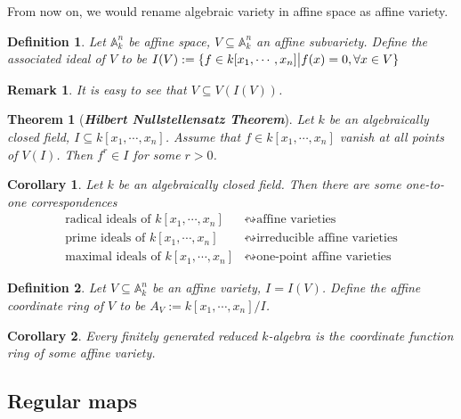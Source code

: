\documentclass{ctexart}
\newtheorem{definition}{Definition}[section]
\newtheorem{remark}{Remark}[section]
\newtheorem{theorem}{Theorem}[section]
\newtheorem{corollary}{Corollary}[section]
\begin{document}
From now on, we would rename algebraic variety in affine space as affine variety.
\begin{definition}
    Let $\mathbb{A}_{k}^{n}$ be affine space, $V \subseteq \mathbb{A}_{k}^{n}$ an affine subvariety.
    Define the associated ideal of $V$ to be $I(V) := \{f\in k[x_{1}, \cdots, x_{n}] \big{|} f(x) = 0, \forall x\in V\}$
\end{definition}
\begin{remark}
    It is easy to see that $V \subseteq V(I(V))$.
\end{remark}
\begin{theorem}[\textbf{\emph{Hilbert Nullstellensatz Theorem}}]
    Let $k$ be an algebraically closed field, $I \subseteq k[x_{1}, \cdots, x_{n}]$.
    Assume that $f\in k[x_{1}, \cdots, x_{n}]$ vanish at all points of $V(I)$.
    Then $f^{r}\in I$ for some $r > 0$.
    \label{Theorem 1.1}
\end{theorem}
\begin{corollary}
    Let $k$ be an algebraically closed field.
    Then there are some one-to-one correspondences
    \begin{equation*}
        \begin{split}
            \text{radical ideals of $k[x_{1}, \cdots, x_{n}]$} & \leftrightsquigarrow \text{affine varieties} \\ 
            \text{prime ideals of $k[x_{1}, \cdots, x_{n}]$} & \leftrightsquigarrow \text{irreducible affine varieties} \\ 
            \text{maximal ideals of $k[x_{1}, \cdots, x_{n}]$} & \leftrightsquigarrow \text{one-point affine varieties} 
        \end{split}
    \end{equation*}
    \label{Corollary 1.1}
\end{corollary}
\vspace{-\baselineskip} %
\begin{definition}
    Let $V \subseteq \mathbb{A}_{k}^{n}$ be an affine variety, $I = I(V)$.
    Define the affine coordinate ring of $V$ to be $A_{V} := k[x_{1}, \cdots, x_{n}]/I$.
\end{definition}
\begin{corollary}
    Every finitely generated reduced $k$-algebra is the coordinate function ring of some affine variety.
    \label{Corollary 1.2}
\end{corollary}

\subsection{Regular maps}
\label{subsection:Affine_Variety_Regular_maps}
\end{document}
